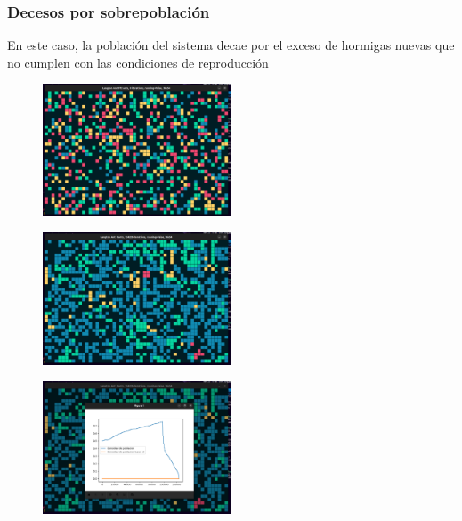 \documentclass[10pt]{article}
\begin{document}
            \subsubsection{Decesos por sobrepoblación}
            En este caso, la población del sistema decae por el exceso de hormigas nuevas que no cumplen con las condiciones de reproducción
            \begin{figure}[h!]
                \centering
                \includegraphics[width=0.5\textwidth]{sobrepoblacion1.png}
            \end{figure}
            \begin{figure}[h!]
                \centering
                \includegraphics[width=0.5\textwidth]{sobrepoblacion2.png}
            \end{figure}
            \begin{figure}[h!]
                \centering
                \includegraphics[width=0.5\textwidth]{sobrepoblacion3.png}
            \end{figure}
\end{document}
